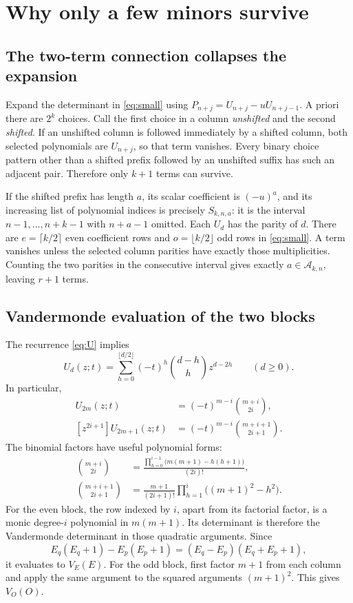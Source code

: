 \documentclass[11pt,letterpaper]{article}
\numberwithin{equation}{section}
\theoremstyle{definition}
\begin{document}
\section{Why only a few minors survive}\label{sec:proof}
\subsection{The two-term connection collapses the expansion}
Expand the determinant in \eqref{eq:small} using
\(P_{n+j}=U_{n+j}-uU_{n+j-1}\). A priori there are \(2^k\)
choices. Call the first choice in a column \emph{unshifted} and the
second \emph{shifted}. If an unshifted column is followed immediately
by a shifted column, both selected polynomials are \(U_{n+j}\), so that
term vanishes. Every binary choice pattern other than a shifted prefix
followed by an unshifted suffix has such an adjacent pair. Therefore
only \(k+1\) terms can survive.

If the shifted prefix has length \(a\), its scalar coefficient is
\((-u)^a\), and its increasing list of polynomial indices is precisely
\(S_{k,n,a}\): it is the interval \(n-1,\ldots,n+k-1\) with
\(n+a-1\) omitted. Each \(U_d\) has the parity of \(d\). There
are \(e=\lceil k/2\rceil\) even coefficient rows and
\(o=\lfloor k/2\rfloor\) odd rows in \eqref{eq:small}. A term vanishes
unless the selected column parities have exactly those multiplicities.
Counting the two parities in the consecutive interval gives exactly
\(a\in\mathcal A_{k,n}\), leaving \(r+1\) terms.

\subsection{Vandermonde evaluation of the two blocks}
The recurrence \eqref{eq:U} implies
\[
 U_d(z;t)=\sum_{h=0}^{\lfloor d/2\rfloor}
  (-t)^h\binom{d-h}{h}z^{d-2h}\qquad(d\ge0).
\]
In particular,
\begin{align}
 [z^{2i}]U_{2m}(z;t)&=(-t)^{m-i}\binom{m+i}{2i},\label{eq:evenentry}\\
 [z^{2i+1}]U_{2m+1}(z;t)&=(-t)^{m-i}\binom{m+i+1}{2i+1}.\label{eq:oddentry}
\end{align}
The binomial factors have useful polynomial forms:
\begin{align}
 \binom{m+i}{2i}
 &=\frac{\displaystyle\prod_{h=0}^{i-1}
       \bigl(m(m+1)-h(h+1)\bigr)}{(2i)!},\label{eq:quadE}\\
 \binom{m+i+1}{2i+1}
 &=\frac{m+1}{(2i+1)!}
    \prod_{h=1}^{i}\bigl((m+1)^2-h^2\bigr).\label{eq:quadO}
\end{align}
For the even block, the row indexed by \(i\), apart from its factorial
factor, is a monic degree-\(i\) polynomial in \(m(m+1)\).
Its determinant is therefore the Vandermonde determinant in those
quadratic arguments. Since
\[
 E_q(E_q+1)-E_p(E_p+1)
 =(E_q-E_p)(E_q+E_p+1),
\]
it evaluates to \(V_E(E)\).
For the odd block, first factor \(m+1\) from each column and apply the
same argument to the squared arguments \((m+1)^2\). This gives
\(V_O(O)\).
\end{document}
